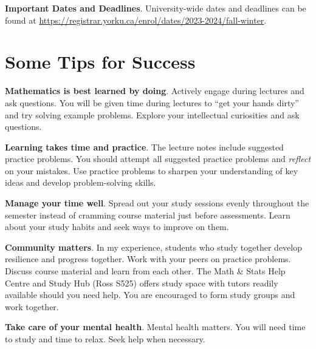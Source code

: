 \documentclass[./main.tex]{subfiles}
\begin{document}
\textbf{Important Dates and Deadlines}. University-wide dates and deadlines can be found at \url{https://registrar.yorku.ca/enrol/dates/2023-2024/fall-winter}.

\section*{Some Tips for Success}

\textbf{Mathematics is best learned by doing}. Actively engage during lectures and ask questions. You will be given time during lectures to ``get your hands dirty'' and try solving example problems. Explore your intellectual curiosities and ask questions. 

\textbf{Learning takes time and practice}. The lecture notes include suggested practice problems. You should attempt all suggested practice problems and \emph{reflect} on your mistakes. Use practice problems to sharpen your understanding of key ideas and develop problem-solving skills. 

\textbf{Manage your time well}. Spread out your study sessions evenly throughout the semester instead of cramming course material just before assessments. Learn about your study habits and seek ways to improve on them. 

\textbf{Community matters}. In my experience, students who study together develop resilience and progress together. Work with your peers on practice problems. Discuss course material and learn from each other. The Math \& Stats Help Centre and Study Hub (Ross S525) offers study space with tutors readily available should you need help. You are encouraged to form study groups and work together. 

\textbf{Take care of your mental health}. Mental health matters. You will need time to study and time to relax. Seek help when necessary. 
\end{document}
